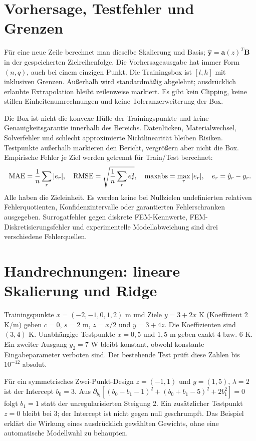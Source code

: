 \section{Vorhersage, Testfehler und Grenzen}
Für eine neue Zeile berechnet man dieselbe Skalierung und Basis;
$\hat{\mathbf y}=\mathbf a(z)^T\mathbf B$ in der gespeicherten Zielreihenfolge.
Die Vorhersageausgabe hat immer Form $(n,q)$, auch bei einem einzigen Punkt.
Die Trainingsbox ist $[l,h]$ mit inklusiven Grenzen. Außerhalb wird standardmäßig
abgelehnt; ausdrücklich erlaubte Extrapolation bleibt zeilenweise markiert.
Es gibt kein Clipping, keine stillen Einheitenumrechnungen und keine
Toleranzerweiterung der Box.

Die Box ist nicht die konvexe Hülle der Trainingspunkte und keine
Genauigkeitsgarantie innerhalb des Bereichs. Datenlücken, Materialwechsel,
Solverfehler und schlecht approximierte Nichtlinearität bleiben Risiken.
Testpunkte außerhalb markieren den Bericht, vergrößern aber nicht die Box.
Empirische Fehler je Ziel werden getrennt für Train/Test berechnet:
\begin{equation}\label{eq:surrogate-errors}
{\rm MAE}=\frac1n\sum_r|e_r|,\quad
{\rm RMSE}=\sqrt{\frac1n\sum_r e_r^2},\quad
{\rm maxabs}=\max_r|e_r|,\quad e_r=\hat y_r-y_r.
\end{equation}
Alle haben die Zieleinheit. Es werden keine bei Nullzielen undefinierten
relativen Fehlerquotienten, Konfidenzintervalle oder garantierten
Fehlerschranken ausgegeben. Surrogatfehler gegen diskrete FEM-Kennwerte,
FEM-Diskretisierungsfehler und experimentelle Modellabweichung sind drei
verschiedene Fehlerquellen.

\section{Handrechnungen: lineare Skalierung und Ridge}
Trainingspunkte $x=(-2,-1,0,1,2)$ m und Ziele $y=3+2x$ K (Koeffizient
2 K/m) geben $c=0$, $s=2$ m, $z=x/2$ und $y=3+4z$.
Die Koeffizienten sind $(3,4)$ K. Unabhängige Testpunkte $x=0{,}5$ und
$1{,}5$ m geben exakt $4$ bzw. $6$ K. Ein zweiter Ausgang $y_2=7$ W
bleibt konstant, obwohl konstante Eingabeparameter verboten sind.
Der bestehende Test prüft diese Zahlen bis $10^{-12}$ absolut.

Für ein symmetrisches Zwei-Punkt-Design $z=(-1,1)$ und $y=(1,5)$,
$\lambda=2$ ist der Intercept $b_0=3$.
Aus $\partial_{b_1}[(b_0-b_1-1)^2+(b_0+b_1-5)^2+2b_1^2]=0$
folgt $b_1=1$ statt der unregularisierten Steigung 2.
Ein zusätzlicher Testpunkt $z=0$ bleibt bei 3; der Intercept ist nicht
gegen null geschrumpft. Das Beispiel erklärt die Wirkung eines ausdrücklich
gewählten Gewichts, ohne eine automatische Modellwahl zu behaupten.

